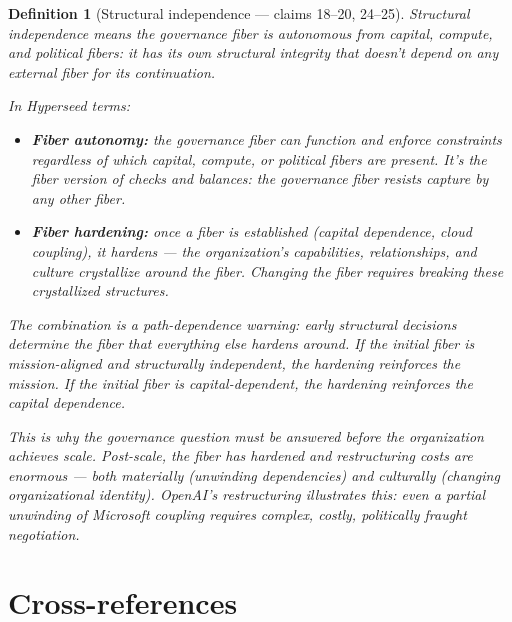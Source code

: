 \documentclass[11pt,a4paper]{article}
\newtheorem{definition}{Definition}[section]
\begin{document}
\begin{definition}[Structural independence --- claims 18--20, 24--25]
\label{def:autonomy}
Structural independence means the governance fiber is autonomous from
capital, compute, and political fibers: it has its own structural
integrity that doesn't depend on any external fiber for its
continuation.

In Hyperseed terms:
\begin{itemize}
\item \textbf{Fiber autonomy:} the governance fiber can function and
  enforce constraints regardless of which capital, compute, or
  political fibers are present. It's the fiber version of checks and
  balances: the governance fiber resists capture by any other fiber.

\item \textbf{Fiber hardening:} once a fiber is established (capital
  dependence, cloud coupling), it hardens --- the organization's
  capabilities, relationships, and culture crystallize around the
  fiber. Changing the fiber requires breaking these crystallized
  structures.
\end{itemize}

The combination is a path-dependence warning: early structural
decisions determine the fiber that everything else hardens around.
If the initial fiber is mission-aligned and structurally independent,
the hardening \emph{reinforces} the mission. If the initial fiber is
capital-dependent, the hardening reinforces the capital dependence.

This is why the governance question must be answered \emph{before}
the organization achieves scale. Post-scale, the fiber has hardened
and restructuring costs are enormous --- both materially (unwinding
dependencies) and culturally (changing organizational identity).
OpenAI's restructuring illustrates this: even a partial unwinding
of Microsoft coupling requires complex, costly, politically fraught
negotiation.
\end{definition}


\section{Cross-references}
\end{document}
